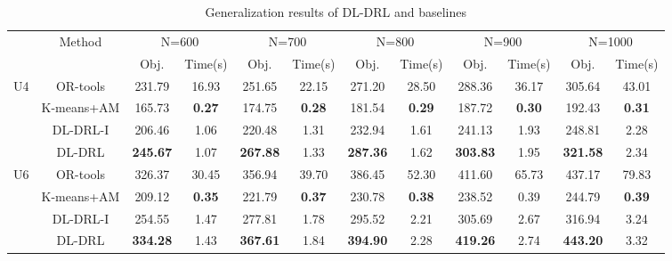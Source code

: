 \documentclass[lettersize,journal]{IEEEtran}
\begin{document}
	\begin{table}[htbp]
		\renewcommand\arraystretch{1.2}
		\footnotesize
		\centering
		\caption{Generalization results of DL-DRL and baselines}
		\begin{tabular}{c|c|cc|cc|cc|cc|cc}
			\toprule
			\multicolumn{1}{c|}{\multirow{2}[2]{*}{}} & \multirow{2}[1]{*}{Method} & \multicolumn{2}{c|}{N=600} & \multicolumn{2}{c|}{N=700} & \multicolumn{2}{c|}{N=800} & \multicolumn{2}{c|}{N=900} & \multicolumn{2}{c}{N=1000} \\
			\multicolumn{1}{c|}{} & \multicolumn{1}{c|}{} & \multicolumn{1}{c}{Obj.} & \multicolumn{1}{c|}{Time(s)} & \multicolumn{1}{c}{Obj.} & \multicolumn{1}{c|}{Time(s)} & \multicolumn{1}{c}{Obj.} & \multicolumn{1}{c|}{Time(s)} & \multicolumn{1}{c}{Obj.} & \multicolumn{1}{c|}{Time(s)} & \multicolumn{1}{c}{Obj.} & \multicolumn{1}{c}{Time(s)} \\
			\midrule
			\multicolumn{1}{c|}{\multirow{4}[1]{*}{U4}} & OR-tools & 231.79 & 16.93 & 251.65 & 22.15 & 271.20 & 28.50 & 288.36 & 36.17 & 305.64 & 43.01 \\
			& K-means+AM & 165.73 & \textbf{0.27} & 174.75 & \textbf{0.28} & 181.54 & \textbf{0.29} & 187.72 & \textbf{0.30}  & 192.43 & \textbf{0.31} \\
			& DL-DRL-I & 206.46 & 1.06  & 220.48 & 1.31  & 232.94 & 1.61  & 241.13 & 1.93  & 248.81 & 2.28 \\
			& DL-DRL & \textbf{245.67} & 1.07  & \textbf{267.88} & 1.33  & \textbf{287.36} & 1.62  & \textbf{303.83} & 1.95  & \textbf{321.58} & 2.34 \\
			\midrule
			\multicolumn{1}{c|}{\multirow{4}[1]{*}{U6}} & OR-tools & 326.37 & 30.45 & 356.94 & 39.70 & 386.45 & 52.30 & 411.60 & 65.73 & 437.17 & 79.83 \\
			& K-means+AM & 209.12 & \textbf{0.35} & 221.79 & \textbf{0.37} & 230.78 & \textbf{0.38} & 238.52 & 0.39  & 244.79 & \textbf{0.39} \\
			& DL-DRL-I & 254.55 & 1.47  & 277.81 & 1.78  & 295.52 & 2.21  & 305.69 & 2.67  & 316.94 & 3.24 \\
			& DL-DRL & \textbf{334.28} & 1.43  & \textbf{367.61} & 1.84  & \textbf{394.90} & 2.28  & \textbf{419.26} & 2.74  & \textbf{443.20} & 3.32 \\
			\bottomrule
		\end{tabular}%
		\label{Table 4}%
	\end{table}%
	
\end{document}

